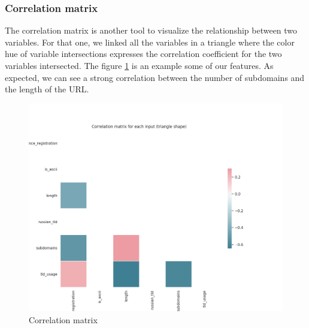 \documentclass[conference,11pt]{IEEEtran}
\begin{document}
\subsubsection{Correlation matrix}
The correlation matrix is another tool to visualize the relationship between two
variables. For that one, we linked all the variables in a triangle where the
color hue of variable intersections expresses the correlation coefficient for
the two variables intersected. The figure \ref{correlation-matrix} is an example
some of our features. As expected, we can see a strong correlation between the
number of subdomains and the length of the URL.

\begin{figure}[!t]
  \centering
  \includegraphics[width=\linewidth]{correlation_matrix}
  \caption{Correlation matrix}
  \label{correlation-matrix}
\end{figure}
\end{document}
